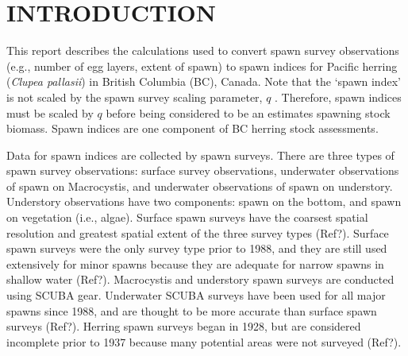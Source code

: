 \documentclass[12pt]{article}
\begin{document}
\renewcommand\listfigurename{LIST OF FIGURES}
\renewcommand\listtablename{LIST OF TABLES}

\renewcommand*{\thefootnote}{\fnsymbol{footnote}}


\tableofcontents \clearpage  %
\listoffigures \listoftables \clearpage  %

\thispagestyle{empty}  %
\renewcommand*{\thefootnote}{\arabic{footnote}}  %
\setcounter{footnote}{0}  %


\section{INTRODUCTION}

This report describes the calculations used to convert spawn survey observations (e.g., number of egg layers, extent of spawn) to spawn indices for Pacific herring (\!\emph{Clupea pallasii}) in British Columbia (BC), Canada.
Note that the `spawn index' is not scaled by the spawn survey scaling parameter, $q$ \citeyearpar[CSAS][]{CSAS2015b}.
Therefore, spawn indices must be scaled by $q$ before being considered to be an estimates spawning stock biomass.
Spawn indices are one component of BC herring stock assessments.

Data for spawn indices are collected by spawn surveys.
There are three types of spawn survey observations: surface survey observations, underwater observations of spawn on Macrocystis, and underwater observations of spawn on understory.
Understory observations have two components: spawn on the bottom, and spawn on vegetation (i.e., algae).
Surface spawn surveys have the coarsest spatial resolution and greatest spatial extent of the three survey types (Ref?).
Surface spawn surveys were the only survey type prior to 1988, and they are still used extensively for minor spawns because they are adequate for narrow spawns in shallow water (Ref?).
Macrocystis and understory spawn surveys are conducted using SCUBA gear.
Underwater SCUBA surveys have been used for all major spawns since 1988, and are thought to be more accurate than surface spawn surveys (Ref?).
Herring spawn surveys began in 1928, but are considered incomplete prior to 1937 because many potential areas were not surveyed (Ref?).
\end{document}
